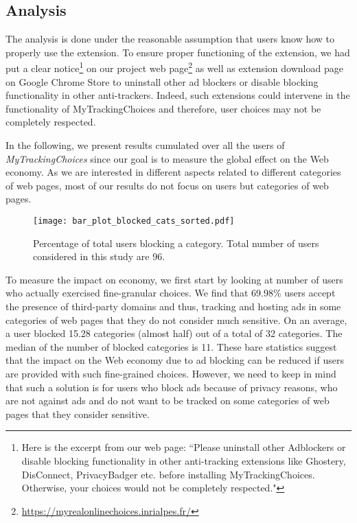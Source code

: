 \documentclass[conference]{IEEEtran}
\begin{document}
\subsection{Analysis}

The analysis is done under the reasonable assumption that users know how to properly use the extension.
To ensure proper functioning of the extension, we had put a clear notice\footnote{Here 
is the excerpt from our web page: ``Please uninstall other Adblockers or disable blocking functionality in other anti-tracking extensions like Ghostery, DisConnect, PrivacyBadger etc. 
before installing MyTrackingChoices. Otherwise, your choices would not be completely respected."} on our project web page\footnote{\url{https://myrealonlinechoices.inrialpes.fr/}} as well as extension download page~\cite{MtcChromeStoreUrl} 
on Google Chrome Store
to uninstall other ad blockers or disable blocking functionality in other anti-trackers.
Indeed, such extensions could intervene in the functionality of MyTrackingChoices and therefore, user choices may not be completely respected.


In the following, we present results cumulated over all the users of \emph{MyTrackingChoices} since our goal is to measure the global effect on the Web economy.
As we are interested in different aspects related to different categories of web pages, most of our results do not focus on users but categories of web pages.


\begin{figure}[t]
\centering
\texttt{[image: bar\_plot\_blocked\_cats\_sorted.pdf]}
\caption{Percentage of total users blocking a category. Total number of users considered in this study are 96.}
\label{fig:blocked_cats_sorted}
\end{figure}

To measure the impact on economy, we first start by looking at number of users who actually exercised fine-granular choices.
We find that 69.98\% users accept the presence of third-party domains and thus, tracking and hosting ads in some categories of web pages that they do not consider much sensitive.
On an average, a user blocked 15.28 categories (almost half) out of a total of 32 categories.
The median of the number of blocked categories is 11.
These bare statistics suggest that the impact on the Web economy due to ad blocking can be reduced if users are provided with such fine-grained choices.
However, we need to keep in mind that such a solution is for users who block ads because of privacy reasons, who are not against ads and do not want to be tracked on some categories of web pages that they consider sensitive.
\end{document}

